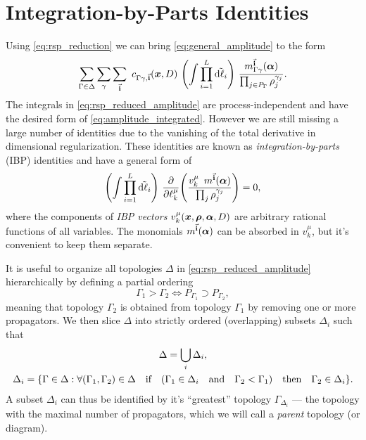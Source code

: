 \section{Integration-by-Parts Identities}


Using \cref{eq:rsp_reduction} we can bring \cref{eq:general_amplitude} to the form 
\begin{equation}
  \sum_{\Gamma \in \Delta} \sum_{\gamma} \sum_{\va{i}} ~ c_{\Gamma\gamma, \va{i}} (\vb*{x},D) ~ 
  \qty(\int \prod_{i=1}^{L} \tilde{\dd{\ell_i}}) ~  
  \frac{m^{\va{i}}_{\Gamma\gamma}(\vb*{\alpha})%
    }{\prod_{j\in P_\Gamma} \rho_j^{\gamma_{j}}}.
  \label{eq:rsp_reduced_amplitude}
\end{equation}
The integrals in \cref{eq:rsp_reduced_amplitude} are process-independent and have the desired form of \cref{eq:amplitude_integrated}.
However we are still missing a large number of identities due to the vanishing of the total derivative in dimensional regularization.
These identities are known as \emph{integration-by-parts} (IBP) identities \cite{Chetyrkin:1981qh,Tkachov:1981wb} and have a general
form of
\begin{equation}
  \qty(\int \prod_{i=1}^{L} \tilde{\dd{\ell_i}}) ~  \pdv{\ell_k^\mu}(
  \frac{ v_k^\mu \ommit{(\vb*{x},\vb*{\rho},\vb*{\alpha},D)} ~ \, m^{\va{i}}(\vb*{\alpha})
    }{\prod_{j} \rho_j^{\gamma_{j}}}
    ) = 0,
  \label{eq:ibps}
\end{equation}
where the components of \emph{IBP vectors} $v_k^\mu(\vb*{x},\vb*{\rho},\vb*{\alpha},D)$ are arbitrary rational functions
of all variables. The monomials $m^{\va{i}}(\vb*{\alpha})$ can be absorbed in $v_k^\mu$, but
it's convenient to keep them separate.

It is useful to organize all topologies $\Delta$ in \cref{eq:rsp_reduced_amplitude}
hierarchically by defining a partial ordering
\begin{equation} \label{eq:topology_order}
    \Gamma_1 > \Gamma_2 \iff P_{\Gamma_1} \supset P_{\Gamma_2},
\end{equation}
meaning that topology $\Gamma_2$ is obtained from topology $\Gamma_1$ by removing one or more propagators.
We then slice $\Delta$ into strictly ordered (overlapping) subsets $\Delta_i$ such that
\begin{subequations} \label{eq:topology_sequence}
    \begin{gather}
         \Delta = \bigcup_i \Delta_i,  \\
         \Delta_i  = \{\Gamma \in \Delta : \forall (\Gamma_1, \Gamma_2) \in\Delta \qif\qty( \Gamma_1 \in \Delta_i \qand \Gamma_2 < \Gamma_1) \qthen \Gamma_2 \in \Delta_i \}.
    \end{gather}
\end{subequations}
A subset $\Delta_i$ can thus be identified by it's ``greatest'' topology $\Gamma_{\Delta_i}$ ---
the topology with the maximal number of propagators, which we will call a \emph{parent} topology (or diagram).


